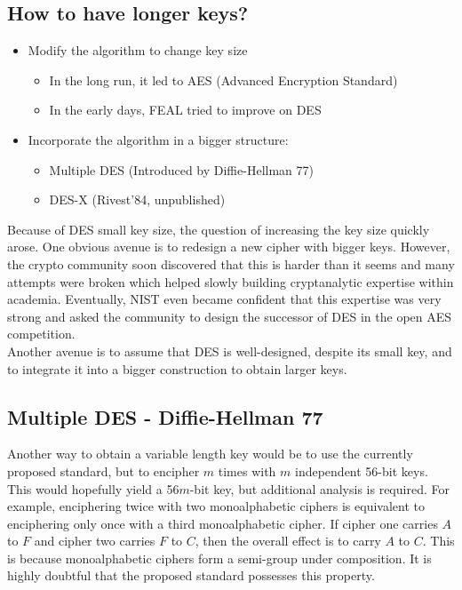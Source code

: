 	\subsection{How to have longer keys?}
		\begin{itemize}
			\item Modify the algorithm to change key size
			\begin{itemize}
				\item In the long run, it led to AES (Advanced Encryption Standard)
				\item In the early days, FEAL tried to improve on DES
			\end{itemize}
			\item Incorporate the algorithm in a bigger structure:
			\begin{itemize}
				\item Multiple DES (Introduced by Diffie-Hellman 77)
				\item DES-X (Rivest’84, unpublished)
			\end{itemize}
		\end{itemize}
		Because of DES small key size, the question of increasing the key size quickly arose. 
		One obvious avenue is to redesign a new cipher with bigger keys. 
		However, the crypto community soon discovered that this is harder than it seems and many attempts were broken which helped slowly building cryptanalytic expertise within academia.
		Eventually, NIST even became confident that this expertise was very strong and asked the community to design the successor of DES in the open AES competition.\\
		Another avenue is to assume that DES is well-designed, despite its small key, and to integrate it into a bigger construction to obtain larger keys.
	
	\subsection{Multiple DES - Diffie-Hellman 77}
		Another way to obtain a variable length key would be to use the currently proposed standard, but to encipher $m$ times with $m$ independent 56-bit keys.
		This would hopefully yield a 56$m$-bit key, but additional analysis is required.
		For example, enciphering twice with two monoalphabetic ciphers is equivalent to enciphering only once with a third monoalphabetic cipher.
		If cipher one carries $A$ to $F$ and cipher two carries $F$ to $C$, then the overall effect is to carry $A$ to $C$.
		This is because monoalphabetic ciphers form a semi-group under composition.
		It is highly doubtful that the proposed standard possesses this property.\\
		
